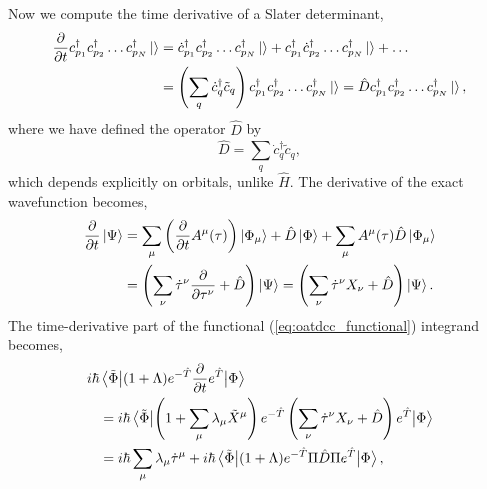 Now we compute the time derivative of a Slater determinant,
\begin{equation*}
    \begin{aligned}
        \frac{\partial}{\partial t} c^\dagger_{p_1}c^\dagger_{p_2}\dots c^\dagger_{p_N}\ket{ }
        &= \dot{c}^\dagger_{p_1} c^\dagger_{p_2}\dots c^\dagger_{p_N} \ket{ }
        + c^\dagger_{p_1} \dot{c}^\dagger_{p_2}\dots c^\dagger_{p_N}\ket{ } + \dots \\
        &= \left(\sum_q \dot{c}^\dagger_q \tilde{c}_q \right)
        c^\dagger_{p_1}c^\dagger_{p_2}\dots c^\dagger_{p_N}\ket{ }
        = \hat{D}c^\dagger_{p_1}c^\dagger_{p_2}\dots c^\dagger_{p_N}\ket{ },
    \end{aligned}
\end{equation*}
where we have defined the operator $\hat{D}$ by 
\begin{equation}
    \hat{D} = \sum_q \dot{c}^\dagger_q \tilde{c}_q,
\end{equation}
which depends explicitly on orbitals, unlike $\hat{H}$. The derivative of the exact 
wavefunction becomes,
\begin{equation}
    \begin{aligned}
        \frac{\partial}{\partial t}\ket{\Psi} 
        &= \sum_\mu \left(\frac{\partial}{\partial t}A^\mu (\tau)\right)\ket{\Phi_\mu}
         + \hat{D}\ket{\Phi} + \sum_\mu A^\mu (\tau) \hat{D} \ket{\Phi_\mu} \\
        &= \left(
            \sum_\nu \dot{\tau}^\nu \frac{\partial}{\partial \tau^\nu} + \hat{D}
        \right)\ket{\Psi}
        = \left(\sum_\nu \dot{\tau}^\nu X_\nu + \hat{D}\right)\ket{\Psi}.
    \end{aligned}
\end{equation}
The time-derivative part of the functional (\autoref{eq:oatdcc_functional}) integrand
becomes,
\begin{equation}
    \begin{aligned}
        i\hbar&\mel{\tilde{\Phi}}
            {(1 + \Lambda)e^{-\hat{T}}\frac{\partial}{\partial t}e^{\hat{T}}}
        {\Phi} \\
        &= i\hbar\mel{\tilde{\Phi}}
            {
            \left(
                1 + \sum_\mu \lambda_\mu \tilde{X}^\mu     
            \right)
            e^{-\hat{T}}
            \left(
                \sum_\nu \dot{\tau}^\nu X_\nu + \hat{D}
            \right)
            e^{\hat{T}}
            }
        {\Phi} \\
        &= i\hbar \sum_\mu \lambda_\mu \dot{\tau}^\mu
        + i\hbar \mel{\tilde{\Phi}}
            {(1 + \Lambda)e^{-\hat{T}}\Pi\hat{D}\Pi e^{\hat{T}}}
        {\Phi},
    \end{aligned}
\end{equation}
